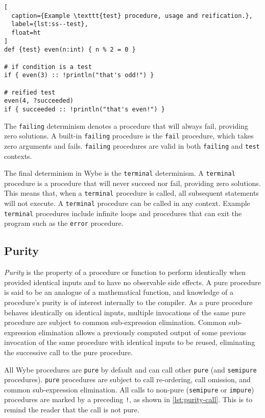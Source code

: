 \begin{lstlisting}[
  caption={Example \texttt{test} procedure, usage and reification.},
  label={lst:ss--test},
  float=ht
]
def {test} even(n:int) { n % 2 = 0 }

# if condition is a test
if { even(3) :: !println("that's odd!") }

# reified test
even(4, ?succeeded)
if { succeeded :: !println("that's even!") }
\end{lstlisting}

The \texttt{failing} determinism denotes a procedure that will always fail, providing zero solutions. A built-in \texttt{failing} procedure is the \texttt{fail} procedure, which takes zero arguments and fails. \texttt{failing} procedures are valid in both \texttt{failing} and \texttt{test} contexts.

The final determinism in Wybe is the \texttt{terminal} determinism. A \texttt{terminal} procedure is a procedure that will never succeed nor fail, providing zero solutions. This means that, when a \texttt{terminal} procedure is called, all subsequent statements will not execute. A \texttt{terminal} procedure can be called in any context. Example \texttt{terminal} procedures include infinite loops and procedures that can exit the program such as the \texttt{error} procedure.

\subsection{Purity}

\textit{Purity} is the property of a procedure or function to perform identically when provided identical inputs and to have no observable side effects. A pure procedure is said to be an analogue of a mathematical function, and knowledge of a procedure's purity is of interest internally to the compiler. As a pure procedure behaves identically on identical inputs, multiple invocations of the same pure procedure are subject to common sub-expression elimination. Common sub-expression elimination allows a previously computed output of some previous invocation of the same procedure with identical inputs to be reused, eliminating the successive call to the pure procedure.

All Wybe procedures are \texttt{pure} by default and can call other \texttt{pure} (and \texttt{semipure} procedures). \texttt{pure} procedures are subject to call re-ordering, call omission, and common sub-expression elimination. All calls to non-pure (\texttt{semipure} or \texttt{impure}) procedures are marked by a preceding \texttt{!}, as shown in \cref{lst:purity-call}. This is to remind the reader that the call is not pure.



